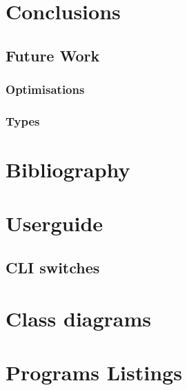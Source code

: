 \documentclass[11pt]{report}
\begin{document}
\chapter{Conclusions}
\section{Future Work}
\subsection{Optimisations}
\subsection{Types}

\chapter{Bibliography}

\begin{appendices}

\chapter{Userguide}
\section{CLI switches}

\chapter{Class diagrams}

\chapter{Programs Listings}

\end{appendices}
\end{document}

